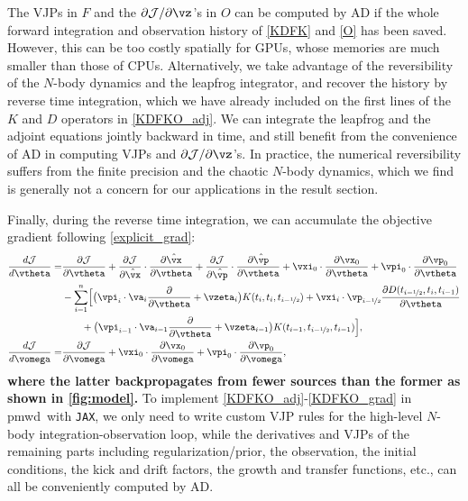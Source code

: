 \documentclass[modern, dvipsnames]{aastex631}
\newcommand{\pmwd}{{\usefont{T1}{nova}{m}{sl}pmwd}}
\renewcommand{\d}{d}
\newcommand{\p}{\partial}
\newcommand{\cJ}{\mathcal{J}}
\newcommand{\half}{\nicefrac12}
\newcommand{\HL}[1]{\textcolor{Bittersweet}{\textbf{#1}}}
\begin{document}
The VJPs in $F$ and the $\p\cJ / \p\vz$'s in $O$ can be computed by AD
if the whole forward integration and observation history of \eqref{KDFK}
and \eqref{O} has been saved.
However, this can be too costly spatially for GPUs, whose memories are
much smaller than those of CPUs.
Alternatively, we take advantage of the reversibility of the $N$-body
dynamics and the leapfrog integrator, and recover the history by reverse
time integration, which we have already included on the first lines of
the $K$ and $D$ operators in \eqref{KDFKO_adj}.
We can integrate the leapfrog and the adjoint equations jointly backward
in time, and still benefit from the convenience of AD in computing VJPs
and $\p\cJ / \p\vz$'s.
In practice, the numerical reversibility suffers from the finite
precision and the chaotic $N$-body dynamics, which we find is generally
not a concern for our applications in the result section.

Finally, during the reverse time integration, we can accumulate the
objective gradient following \eqref{explicit_grad}:
%
\begin{align}
\frac{\d\cJ}{\d\vtheta} =& \frac{\p\cJ}{\p\vtheta}
%
  + \frac{\p\cJ}{\p\hat\vx} \cdot \frac{\p\hat\vx}{\p\vtheta}
  + \frac{\p\cJ}{\p\hat\vp} \cdot \frac{\p\hat\vp}{\p\vtheta}
%
  + \vxi_0 \cdot \frac{\p\vx_0}{\p\vtheta}
  + \vpi_0 \cdot \frac{\p\vp_0}{\p\vtheta} \nonumber\\
%
  &- \sum_{i=1}^n \Bigl[
    \bigl( \vpi_i \cdot\va_i \frac\p{\p\vtheta} + \vzeta_i
      \bigr) K(t_i, t_i, t_{i-\half})
    + \vxi_i \cdot \vp_{i-\half}
      \frac{\p D(t_{i-\half}, t_i, t_{i-1})}{\p\vtheta} \nonumber\\
    &\qquad + \bigl( \vpi_{i-1} \cdot \va_{i-1} \frac\p{\p\vtheta}
      + \vzeta_{i-1} \bigr) K(t_{i-1}, t_{i-\half}, t_{i-1})
    \Bigr], \nonumber\\
%
\frac{\d\cJ}{\d\vomega} =& \frac{\p\cJ}{\p\vomega}
%
  + \vxi_0 \cdot \frac{\p\vx_0}{\p\vomega}
  + \vpi_0 \cdot \frac{\p\vp_0}{\p\vomega},
\label{KDFKO_grad}
\end{align}
%
\HL{where the latter backpropagates from fewer sources than the former as
shown in \autoref{fig:model}.}
To implement \eqref{KDFKO_adj}-\eqref{KDFKO_grad} in \pmwd\ with
\texttt{JAX}, we only need to write custom VJP rules for the high-level
$N$-body integration-observation loop, while the derivatives and VJPs of
the remaining parts including regularization/prior, the observation, the
initial conditions, the kick and drift factors, the growth and transfer
functions, etc., can all be conveniently computed by AD.
\end{document}
